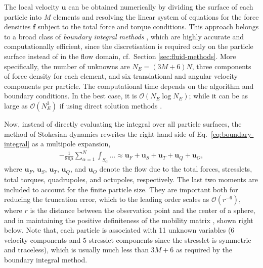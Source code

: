 The local velocity $\bm{u}$ can be obtained numerically by dividing the surface of each particle into $M$ elements and resolving the linear system of equations for the force densities $\bm f$ subject to the total force and torque conditions.
This approach belongs to a broad class of \emph{boundary integral methods} \citep{Pozrikidis}, which are highly accurate and computationally efficient, since the discretisation is required only on the particle surface instead of in the flow domain, cf.\ Section \ref{sec:fluid-methods}.
More specifically, the number of unknowns are $N_E=(3M+6)N$, \ie three components of force density for each element, and six translational and angular velocity components per particle.
The computational time depends on the algorithm and boundary conditions. In the best case, it is $\mathcal{O}(N_E\log N_E)$; while it can be as large as $\mathcal{O}(N_E^3)$ if using direct solution methods \citep{graham_2018}.

Now, instead of directly evaluating the integral over all particle surfaces, the method of Stokesian dynamics \citep{durlofsky_brady_bossis_1987} rewrites the right-hand side of Eq.\ \eqref{eq:boundary-integral} as a multipole expansion, \viz
\begin{equation} \label{eq:sd-multipole}
 \begin{aligned}
  - \frac{1}{8\pi \mu} \sum_{\alpha=1}^N  \int_{S_\alpha} ... \approx \bm{u}_F + \bm{u}_S + \bm{u}_T + \bm{u}_Q + \bm{u}_O , 
 \end{aligned}
\end{equation}
where $\bm{u}_F$, $\bm{u}_S$, $\bm{u}_T$, $\bm{u}_Q$, and $\bm{u}_O$ denote the flow due to the total forces, stresslets, total torques, quadrupoles, and octupoles, respectively.
The last two moments are included to account for the finite particle size. They are important both for reducing the truncation error, which to the leading order scales as $\mathcal{O}(r^{-6})$, where $r$ is the distance between the observation point and the center of a sphere, and in maintaining the positive definiteness of the mobility matrix \citep{durlofsky_brady_bossis_1987}, shown right below.
Note that, each particle is associated with 11 unknown variables (6 velocity components and 5 stresslet components since the stresslet is symmetric and traceless), which is usually much less than $3M+6$ as required by the boundary integral method.

